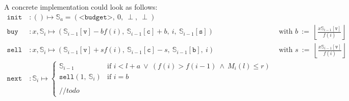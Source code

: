 \documentclass[paper=a4, fontsize=11pt]{scrartcl}
\numberwithin{equation}{section}
\numberwithin{figure}{section}
\numberwithin{table}{section}
\newcommand{\state}[2]{\mathbb{S}_{#1}\left[\texttt{#2}\right]}
\begin{document}
    \vspace{1cm}
	A concrete implementation could look as follows:
	\begin{align}
		\texttt{init} &\ : () \longmapsto \mathbb{S}_a = \left( \texttt{<budget>},\ 0,\ \perp,\ \perp \right) \\
		\texttt{buy} &\ : x, \mathbb{S}_i \longmapsto \left( \state{i-1}{v} - b f(i),\ \state{i-1}{c} + b,\ i,\ \state{i-1}{s} \right)
		 \quad & \text{with } b \ := \ \left\lfloor \frac{x\state{i-1}{v}}{f(i)} \right\rfloor
		\\
		\texttt{sell} &\ : x, \mathbb{S}_i \longmapsto \left( \state{i-1}{v} + s f(i),\ \state{i-1}{c} - s,\ \state{i-1}{b},\ i \right)
		\quad & \text{with } s \ := \ \left\lfloor \frac{x\state{i-1}{v}}{f(i)} \right\rfloor
		\\
		\texttt{next} &\ : \mathbb{S}_i \longmapsto
		\begin{cases}
			\mathbb{S}_{i-1} & \text{if } i < l + a \ \vee \ \left( f(i) > f(i-1) \ \wedge \ M_i(l) \leq r \right) \\
			\texttt{sell}(1,\ \mathbb{S}_i) & \text{if } i = b \\
			\\
			// todo
		\end{cases}
	\end{align}
\end{document}
